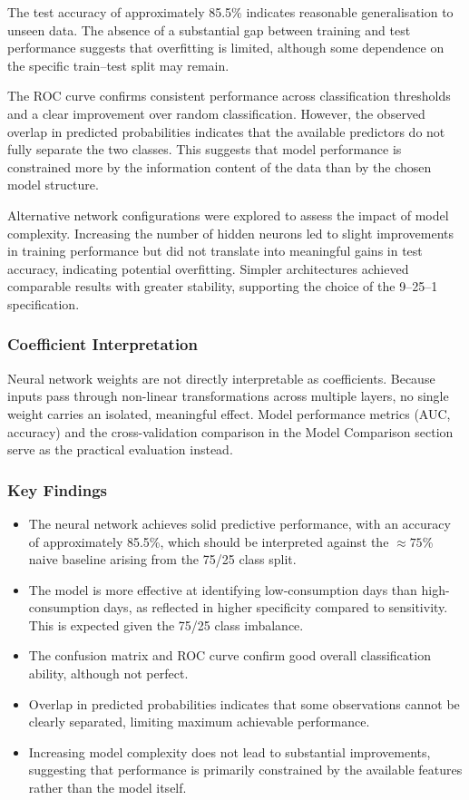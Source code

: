\documentclass[
]{article}
\begin{document}
The test accuracy of approximately 85.5\% indicates reasonable
generalisation to unseen data. The absence of a substantial gap between
training and test performance suggests that overfitting is limited,
although some dependence on the specific train--test split may remain.

The ROC curve confirms consistent performance across classification
thresholds and a clear improvement over random classification. However,
the observed overlap in predicted probabilities indicates that the
available predictors do not fully separate the two classes. This
suggests that model performance is constrained more by the information
content of the data than by the chosen model structure.

Alternative network configurations were explored to assess the impact of
model complexity. Increasing the number of hidden neurons led to slight
improvements in training performance but did not translate into
meaningful gains in test accuracy, indicating potential overfitting.
Simpler architectures achieved comparable results with greater
stability, supporting the choice of the 9--25--1 specification.

\subsubsection{Coefficient
Interpretation}\label{coefficient-interpretation}

Neural network weights are not directly interpretable as coefficients.
Because inputs pass through non-linear transformations across multiple
layers, no single weight carries an isolated, meaningful effect. Model
performance metrics (AUC, accuracy) and the cross-validation comparison
in the Model Comparison section serve as the practical evaluation
instead.

\subsubsection{Key Findings}\label{key-findings-3}

\begin{itemize}
\item
  The neural network achieves solid predictive performance, with an
  accuracy of approximately 85.5\%, which should be interpreted against
  the \(\approx 75\)\% naive baseline arising from the 75/25 class
  split.
\item
  The model is more effective at identifying low-consumption days than
  high- consumption days, as reflected in higher specificity compared to
  sensitivity. This is expected given the 75/25 class imbalance.
\item
  The confusion matrix and ROC curve confirm good overall classification
  ability, although not perfect.
\item
  Overlap in predicted probabilities indicates that some observations
  cannot be clearly separated, limiting maximum achievable performance.
\item
  Increasing model complexity does not lead to substantial improvements,
  suggesting that performance is primarily constrained by the available
  features rather than the model itself.
\end{itemize}
\end{document}
